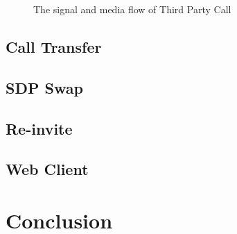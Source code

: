 \begin{figure}[!hbtp]
\centering
{}
\caption{The signal and media flow of Third Party Call}
\label{fig:TheSignalAndMediaFlowOf3pc}
\end{figure}




\subsection{Call Transfer}
\label{sec:Solution:ThirdPartyCall:CallTransfer}


\subsection{SDP Swap}
\label{sec:Solution:ThirdPartyCall:SDPSwep}

\subsection{Re-invite}
\label{sec:Solution:ThirdPartyCall:Re-invite}

\subsection{Web Client}
\label{sec:Solution:ThirdPartyCall:WebClient}


\section{Conclusion}
\label{sec:Solution:Conclusion}




